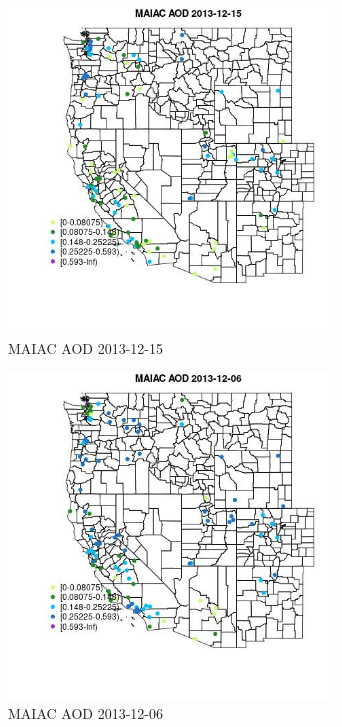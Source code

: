 \begin{figure} 
\centering  
\includegraphics[width=0.77\textwidth]{Code_Outputs/Report_ML_input_PM25_Step4_part_e_de_duplicated_aves_MapObsMAIAC_AOD2013-12-15.jpg} 
\caption{\label{fig:Report_ML_input_PM25_Step4_part_e_de_duplicated_avesMapObsMAIAC_AOD2013-12-15}MAIAC AOD 2013-12-15} 
\end{figure} 
 

\clearpage 

\begin{figure} 
\centering  
\includegraphics[width=0.77\textwidth]{Code_Outputs/Report_ML_input_PM25_Step4_part_e_de_duplicated_aves_MapObsMAIAC_AOD2013-12-06.jpg} 
\caption{\label{fig:Report_ML_input_PM25_Step4_part_e_de_duplicated_avesMapObsMAIAC_AOD2013-12-06}MAIAC AOD 2013-12-06} 
\end{figure} 
 

